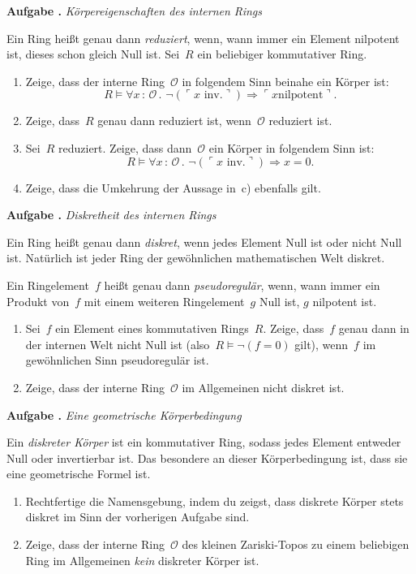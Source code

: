 \documentclass[a4paper,ngerman,12pt]{scrartcl}
\theoremstyle{definition}
\theoremstyle{plain}
\theoremstyle{remark}
\renewcommand{\O}{\mathcal{O}}
\renewcommand{\_}{\mathpunct{.}\,}
\newcommand{\?}{\,{:}\,}
\newcommand{\speak}[1]{\ulcorner\text{#1}\urcorner}
\newlength{\aufgabenskip}
\newcounter{aufgabennummer}
\newenvironment{aufgabe}[1]{
  \addtocounter{aufgabennummer}{1}
  \textbf{Aufgabe \theaufgabennummer{}.} \emph{#1} \par
}{\vspace{\aufgabenskip}}
\begin{document}
\enlargethispage{0.5cm}
\begin{aufgabe}{Körpereigenschaften des internen Rings}
Ein Ring heißt genau dann \emph{reduziert}, wenn, wann immer ein Element
nilpotent ist, dieses schon gleich Null ist.
Sei~$R$ ein beliebiger kommutativer Ring.
\begin{enumerate}
\item Zeige, dass der interne Ring~$\O$ in folgendem Sinn beinahe ein Körper
ist:
\[ R \models \forall x\?\O\_ \neg(\speak{$x$ inv.}) \Rightarrow \speak{$x$
nilpotent}. \]
\vspace*{-1.8em}%
\item Zeige, dass~$R$ genau dann reduziert ist, wenn~$\O$ reduziert ist.
\item Sei~$R$ reduziert. Zeige, dass dann~$\O$ ein Körper in folgendem Sinn
ist:
\[ R \models \forall x\?\O\_ \neg(\speak{$x$ inv.}) \Rightarrow x = 0. \]
\vspace*{-1.8em}%
\item Zeige, dass die Umkehrung der Aussage in~c) ebenfalls gilt.
\end{enumerate}
\end{aufgabe}

\begin{aufgabe}{Diskretheit des internen Rings}
Ein Ring heißt genau dann \emph{diskret}, wenn jedes Element Null ist oder
nicht Null ist. Natürlich ist jeder Ring der gewöhnlichen mathematischen Welt
diskret.

Ein Ringelement~$f$ heißt genau dann \emph{pseudoregulär}, wenn,
wann immer ein Produkt von~$f$ mit einem weiteren Ringelement~$g$ Null ist, $g$
nilpotent ist.
\begin{enumerate}
\item Sei~$f$ ein Element eines kommutativen Rings~$R$. Zeige, dass~$f$ genau
dann in der internen Welt nicht Null ist (also~$R \models \neg(f = 0)$ gilt),
wenn~$f$ im gewöhnlichen Sinn pseudoregulär ist.
\item Zeige, dass der interne Ring~$\O$ im Allgemeinen nicht diskret ist.
\end{enumerate}
\end{aufgabe}

\begin{aufgabe}{Eine geometrische Körperbedingung}
Ein \emph{diskreter Körper} ist ein kommutativer Ring, sodass jedes Element
entweder Null oder invertierbar ist. Das besondere an dieser Körperbedingung
ist, dass sie eine geometrische Formel ist.
\begin{enumerate}
\item Rechtfertige die Namensgebung, indem du zeigst, dass diskrete Körper
stets diskret im Sinn der vorherigen Aufgabe sind.
\item Zeige, dass der
interne Ring~$\O$ des kleinen Zariski-Topos zu einem beliebigen Ring im
Allgemeinen \emph{kein} diskreter Körper ist.
\end{enumerate}
\end{aufgabe}
\end{document}
